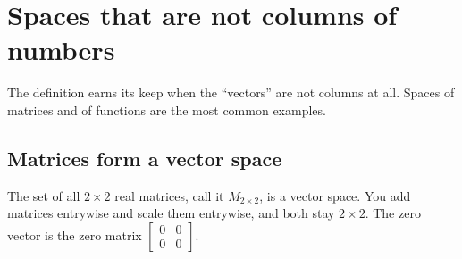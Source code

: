 \section{Spaces that are not columns of numbers}

The definition earns its keep when the ``vectors'' are not
columns at all. Spaces of matrices and of functions are the most common examples.

\subsection{Matrices form a vector space}

The set of all $2\times 2$ real matrices, call it $M_{2\times 2}$, is a vector space. You
add matrices entrywise and scale them entrywise, and both stay $2\times 2$. The zero
vector is the zero matrix $\begin{bmatrix}0&0\\0&0\end{bmatrix}$.

